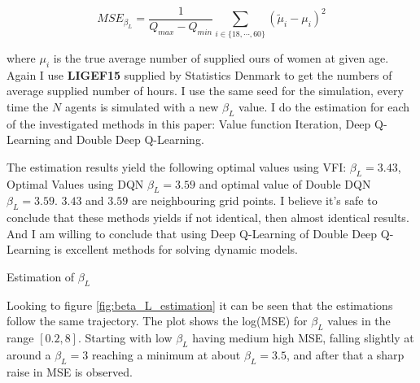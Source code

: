 \begin{equation}
    MSE_{\beta_L} = \frac{1}{Q_{max} - Q_{min}}\sum_{i \in \{18, \cdots, 60\}} (\tilde{\mu}_i - \mu_i)^2
\end{equation}

where $\mu_i$ is the true average number of supplied ours of women at given age. Again I use \textbf{LIGEF15} supplied by Statistics Denmark to get the numbers of average supplied number of hours. I use the same seed for the simulation, every time the $N$ agents is simulated with a new $\beta_L$ value. I do the estimation for each of the investigated methods in this paper: Value function Iteration, Deep Q-Learning and Double Deep Q-Learning. 

The estimation results yield the following optimal values using VFI: $\beta_L=3.43$, Optimal Values using DQN $\beta_L=3.59$ and optimal value of Double DQN $\beta_L=3.59$. $3.43$ and $3.59$ are neighbouring grid points. I believe it's safe to conclude that these methods yields if not identical, then almost identical results. And I am willing to conclude that using Deep Q-Learning of Double Deep Q-Learning is excellent methods for solving dynamic models.

\begin{table}[ht]
    \centering
    
    \caption{Estimation of $\beta_L$}
    \label{tab:beta_L_Estimation}
\end{table}

Looking to figure \ref{fig:beta_L_estimation} it can be seen that the estimations follow the same trajectory. The plot shows the log(MSE) for $\beta_L$ values in the range $[0.2, 8]$. Starting with low $\beta_L$ having medium high MSE, falling slightly at around a $\beta_L = 3$ reaching a minimum at about $\beta_L = 3.5$, and after that a sharp raise in MSE is observed. 

